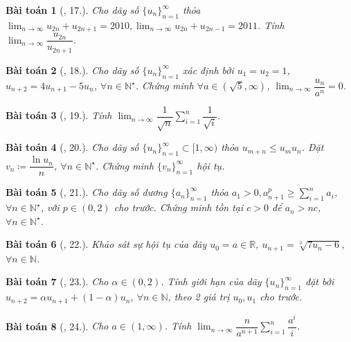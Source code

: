 \documentclass[oneside]{book}
\newtheorem{baitoan}{Bài toán}
\begin{document}
\begin{baitoan}[\cite{TLCT_dai_so_giai_tich_11}, 17.]
	Cho dãy số $\{u_n\}_{n=1}^\infty$ thỏa $\lim_{n\to\infty} u_{2n} + u_{2n+1} = 2010,\lim_{n\to\infty} u_{2n} + u_{2n-1} = 2011$. Tính $\lim_{n\to\infty} \dfrac{u_{2n}}{u_{2n+1}}$.
\end{baitoan}

\begin{baitoan}[\cite{TLCT_dai_so_giai_tich_11}, 18.]
	Cho dãy số $\{u_n\}_{n=1}^\infty$ xác định bởi $u_1 = u_2 = 1$, $u_{n+2} = 4u_{n+1} - 5u_n$, $\forall n\in\mathbb{N}^\star$. Chứng minh $\forall a\in(\sqrt{5},\infty)$, $\lim_{n\to\infty} \dfrac{u_n}{a^n} = 0$. 
\end{baitoan}

\begin{baitoan}[\cite{TLCT_dai_so_giai_tich_11}, 19.]
	Tính $\lim_{n\to\infty} \dfrac{1}{\sqrt{n}}\sum_{i=1}^n \dfrac{1}{\sqrt{i}}$.
\end{baitoan}

\begin{baitoan}[\cite{TLCT_dai_so_giai_tich_11}, 20.]
	Cho dãy số $\{u_n\}_{n=1}^\infty\subset[1,\infty)$ thỏa $u_{m+n}\le u_mu_n$. Đặt $v_n\coloneqq\dfrac{\ln u_n}{n}$, $\forall n\in\mathbb{N}^\star$. Chứng minh $\{v_n\}_{n=1}^\infty$ hội tụ.
\end{baitoan}

\begin{baitoan}[\cite{TLCT_dai_so_giai_tich_11}, 21.]
	Cho dãy số dương $\{a_n\}_{n=1}^\infty$ thỏa $a_1 > 0,a_{n+1}^p\ge\sum_{i=1}^n a_i$, $\forall n\in\mathbb{N}^\star$, với $p\in(0,2)$ cho trước. Chứng minh tồn tại $c > 0$ để $a_n > nc$, $\forall n\in\mathbb{N}^\star$.
\end{baitoan}

\begin{baitoan}[\cite{TLCT_dai_so_giai_tich_11}, 22.]
	Khảo sát sự hội tụ của dãy $u_0 = a\in\mathbb{R}$, $u_{n+1} = \sqrt[3]{7u_n - 6}$, $\forall n\in\mathbb{N}$.
\end{baitoan}

\begin{baitoan}[\cite{TLCT_dai_so_giai_tich_11}, 23.]
	Cho $\alpha\in(0,2)$. Tính giới hạn của dãy $\{u_n\}_{n=1}^\infty$ đặt bởi $u_{n+2} = \alpha u_{n+1} + (1 - \alpha)u_n$, $\forall n\in\mathbb{N}$, theo 2 giá trị $u_0,u_1$ cho trước.
\end{baitoan}

\begin{baitoan}[\cite{TLCT_dai_so_giai_tich_11}, 24.]
	Cho $a\in(1,\infty)$. Tính $\lim_{n\to\infty} \dfrac{n}{a^{n+1}}\sum_{i=1}^n \dfrac{a^i}{i}$.
\end{baitoan}
\end{document}
